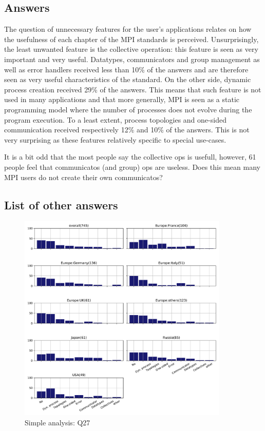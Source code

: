 
\subsection{Answers}


The question of unnecessary features for the user’s applications relates on how
the usefulness of each chapter of the MPI standards is perceived. Unsurprisingly, the
least unwanted feature is the collective operation: this feature is seen as
very important and very useful. Datatypes, communicators and group management
as well as  error handlers received less than 10\% of the answers and are
therefore seen as very useful characteristics of the standard. On the other
side, dynamic process creation received 29\% of the answers. This means that
such feature is not used in many applications and that more generally, MPI is seen
as a static programming model where the number of processes does not evolve
during the program execution. To a least extent, process topologies and
one-sided communication received respectively 12\% and 10\% of the answers. This
is not very surprising as these features relatively specific to special
use-cases. 

It is a bit odd that the most people say the collective ops is
usefull, however, 61 people feel that communicatos (and group) ops are
useless. Does this mean many MPI users do not create their own communicatos?

\subsection{List of other answers}
\begin{itemize}

\end{itemize}

\begin{figure}[htb]
\begin{center}
\includegraphics[width=10cm]{../pdfs/Q27.pdf}
\caption{Simple analysis: Q27}
\label{fig:Q27}
\end{center}
\end{figure}
